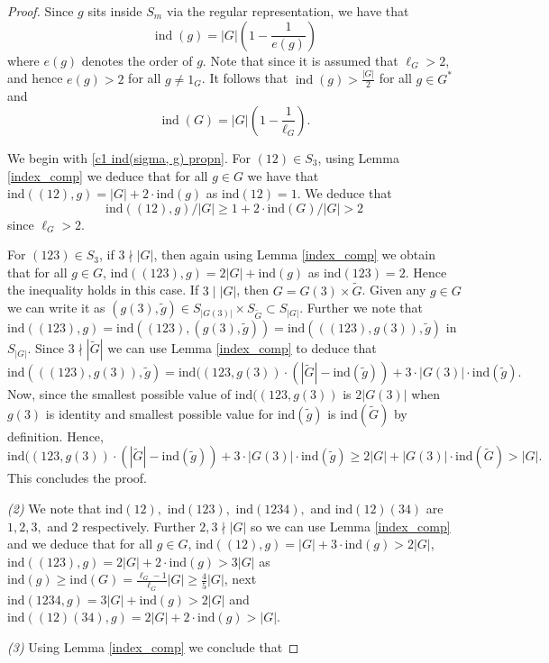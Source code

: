 \documentclass[11pt]{amsart}
\newcommand{\ind}{\mathrm{ind}}
\newcommand{\op}[1]{\operatorname{#1}}
\numberwithin{equation}{section}
\begin{document}
\begin{proof} Since $g$ sits inside $S_m$ via the regular representation, we have that \begin{equation}\label{ind g equation}\op{ind}(g)=|G|\left(1-\frac{1}{e(g)}\right)\end{equation} where $e(g)$ denotes the order of $g$. Note that since it is assumed that $\ell_G>2$, and hence $e(g)>2$ for all $g\neq 1_G$. It follows that $\op{ind}(g)>\frac{|G|}{2}$ for all $g\in G^\ast$ and \[\op{ind}(G)=|G|\left(1-\frac{1}{\ell_G}\right).\]
\par We begin with \eqref{c1 ind(sigma, g) propn}. For $(12) \in S_3$, using Lemma \ref{index_comp} we deduce that for all $g \in G$ we have that $\ind((12),g) = |G| + 2\cdot \ind(g)$ as $\ind(12) = 1$. We deduce that \[\ind((12),g)/|G| \geq 1 + 2\cdot\ind(G)/|G| > 2\]
since $\ell_G > 2$.
\par For $(123) \in S_3$, if $3 \nmid |G|$, then again using Lemma \ref{index_comp} we obtain that for all $g \in G$, $\ind((123),g) = 2|G| + \ind(g)$ as $\ind(123) = 2$. Hence the inequality holds in this case. If $3 \mid |G|$, then $G= G(3)\times \widetilde{G}$. Given any $g \in G$ we can write it as $(g(3), \widetilde{g}) \in S_{|G(3)|}\times S_{\widetilde{G}} \subset S_{|G|}$. Further we note that $\ind((123),g) = \ind((123),(g(3),\widetilde{g})) = \ind(((123),g(3)),\widetilde{g})$ in $S_{|G|}$. Since $3 \nmid |\widetilde{G}|$ we can use Lemma \ref{index_comp} to deduce that \[\ind(((123),g(3)),\widetilde{g}) = \ind((123,g(3))\cdot(|\widetilde{G}|-\ind(\widetilde{g}))+3\cdot|G(3)|\cdot\ind(\widetilde{g}).\] Now, since the smallest possible value of $\ind((123,g(3))$ is $2|G(3)|$ when $g(3)$ is identity and smallest possible value for $\ind(\widetilde{g})$ is $\ind(\widetilde{G})$ by definition. Hence, \[
\ind((123,g(3))\cdot(|\widetilde{G}|-\ind(\widetilde{g}))+3\cdot|G(3)|\cdot\ind(\widetilde{g}) \geq 2|G| + |G(3)|\cdot\ind(\widetilde{G}) > |G|.\] This concludes the proof.
\par \textit{(2)} We note that  $\ind(12),$ $\ind(123),$ $\ind(1234),$ and $\ind(12)(34)$ are $1, 2, 3,$ and $2$ respectively. Further $2,3 \nmid |G|$ so we can use Lemma \ref{index_comp} and we deduce that for all $g \in G$, $\ind((12),g) = |G| + 3\cdot\ind(g) > 2|G|$, $\ind((123),g) = 2|G| + 2\cdot\ind(g) > 3|G|$ as $\ind(g) \geq \ind(G) = \frac{\ell_G-1}{\ell_G} |G| \geq \frac{4}{5}|G|$, next $\ind(1234, g) = 3|G| + \ind(g) > 2|G|$ and $\ind((12)(34), g) = 2|G| + 2\cdot \ind(g) > |G|$.
\par \textit{(3)} Using Lemma \ref{index_comp} we conclude that 

\end{proof}
\end{document}
